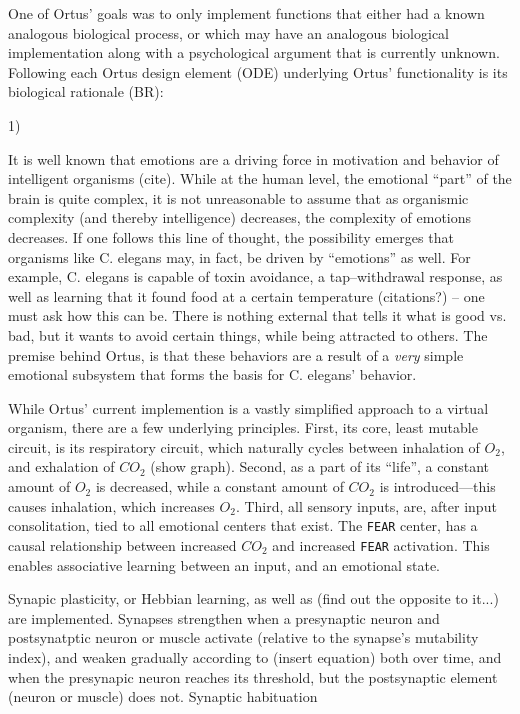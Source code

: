 \documentclass[letterpaper]{article}
\begin{document}
One of Ortus' goals was to only implement functions that either had a known analogous biological process, or which may have an analogous biological implementation along with a psychological argument that is currently unknown. Following each Ortus design element (ODE) underlying Ortus' functionality is its biological rationale (BR):

1)


It is well known that emotions are a driving force in motivation and behavior of intelligent organisms (cite). While at the human level, the emotional ``part'' of the brain is quite complex, it is not unreasonable to assume that as organismic complexity (and thereby intelligence) decreases, the complexity of emotions decreases. If one follows this line of thought, the possibility emerges that organisms like C. elegans may, in fact, be driven by ``emotions'' as well. For example, C. elegans is capable of toxin avoidance, a tap--withdrawal response, as well as learning that it found food at a certain temperature (citations?) -- one must ask how this can be. There is nothing external that tells it what is good vs. bad, but it wants to avoid certain things, while being attracted to others. The premise behind Ortus, is that these behaviors are a result of a \textit{very} simple emotional subsystem that forms the basis for C. elegans' behavior.

While Ortus' current implemention is a vastly simplified approach to a virtual organism, there are a few underlying principles. First, its core, least mutable circuit, is its respiratory circuit, which naturally cycles between inhalation of $O_2$, and exhalation of $CO_2$ (show graph). Second, as a part of its ``life'', a constant amount of $O_2$ is decreased, while a constant amount of $CO_2$ is introduced---this causes inhalation, which increases $O_2$. Third, all sensory inputs, are, after input consolitation, tied to all emotional centers that exist. The \texttt{FEAR} center, has a causal relationship between increased $CO_2$ and increased \texttt{FEAR} activation. This enables associative learning between an input, and an emotional state.


Synapic plasticity, or Hebbian learning, as well as (find out the opposite to it...) are implemented. Synapses strengthen when a presynaptic neuron and postsynatptic neuron or muscle activate (relative to the synapse's mutability index), and weaken gradually according to (insert equation) both over time, and when the presynapic neuron reaches its threshold, but the postsynaptic element (neuron or muscle) does not.
Synaptic habituation
\end{document}
